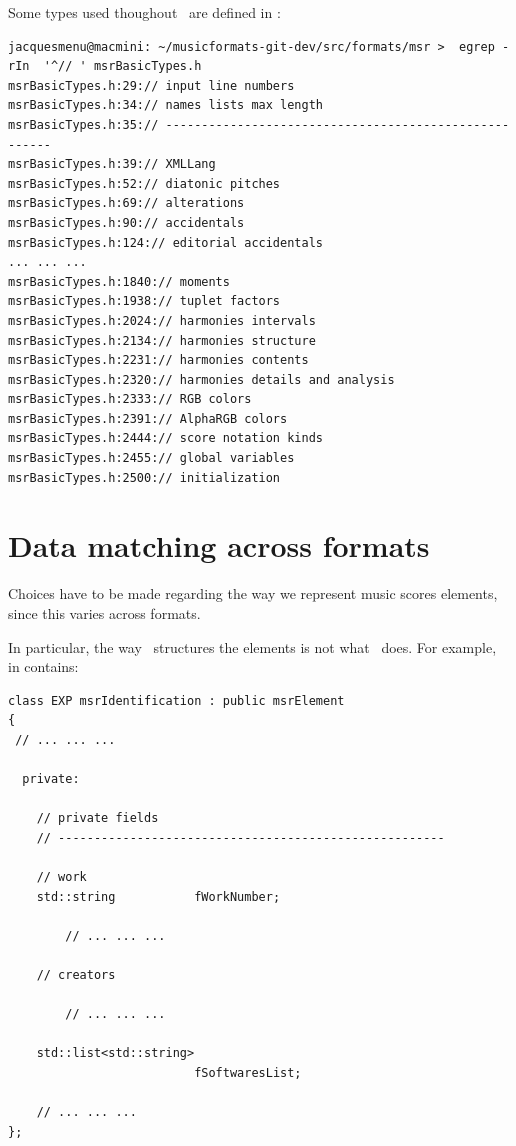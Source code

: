 Some types used thoughout \msrRepr\ are defined in :%
\begin{lstlisting}[language=Terminal]
jacquesmenu@macmini: ~/musicformats-git-dev/src/formats/msr >  egrep -rIn  '^// ' msrBasicTypes.h
msrBasicTypes.h:29:// input line numbers
msrBasicTypes.h:34:// names lists max length
msrBasicTypes.h:35:// ------------------------------------------------------
msrBasicTypes.h:39:// XMLLang
msrBasicTypes.h:52:// diatonic pitches
msrBasicTypes.h:69:// alterations
msrBasicTypes.h:90:// accidentals
msrBasicTypes.h:124:// editorial accidentals
... ... ...
msrBasicTypes.h:1840:// moments
msrBasicTypes.h:1938:// tuplet factors
msrBasicTypes.h:2024:// harmonies intervals
msrBasicTypes.h:2134:// harmonies structure
msrBasicTypes.h:2231:// harmonies contents
msrBasicTypes.h:2320:// harmonies details and analysis
msrBasicTypes.h:2333:// RGB colors
msrBasicTypes.h:2391:// AlphaRGB colors
msrBasicTypes.h:2444:// score notation kinds
msrBasicTypes.h:2455:// global variables
msrBasicTypes.h:2500:// initialization
\end{lstlisting}


\section{Data matching across formats}\label{Data matching across formats}

Choices have to be made regarding the way we represent music scores elements, since this varies across formats.

In particular, the way \mxml\ structures the elements is not what \msrRepr\ does. For example,  in  contains:
\begin{lstlisting}[language=CPlusPlus]
class EXP msrIdentification : public msrElement
{
 // ... ... ...

  private:

    // private fields
    // ------------------------------------------------------

    // work
    std::string           fWorkNumber;

		// ... ... ...

    // creators

		// ... ... ...

    std::list<std::string>
                          fSoftwaresList;

	// ... ... ...
};
\end{lstlisting}

